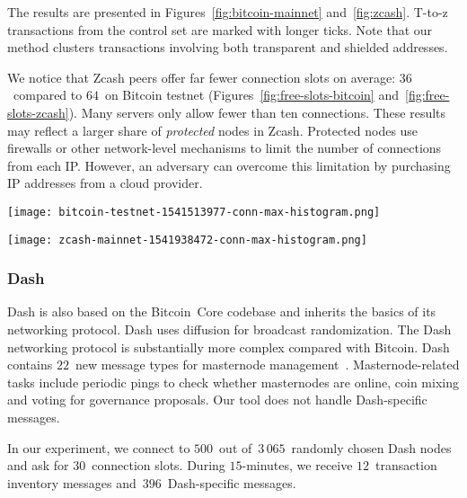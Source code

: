 The results are presented in Figures~\ref{fig:bitcoin-mainnet} and~\ref{fig:zcash}.
T-to-z transactions from the control set are marked with longer ticks.
Note that our method clusters transactions involving both transparent and shielded addresses.

We notice that Zcash peers offer far fewer connection slots on average: $36$~compared to $64$~on Bitcoin testnet (Figures~\ref{fig:free-slots-bitcoin} and~\ref{fig:free-slots-zcash}).
Many servers only allow fewer than ten connections.
These results may reflect a larger share of \textit{protected} nodes in Zcash.
Protected nodes use firewalls or other network-level mechanisms to limit the number of connections from each IP\@.
However, an adversary can overcome this limitation by purchasing IP addresses from a cloud provider.

\begin{figure*}
	\centering
	\begin{minipage}{0.5\textwidth}
		\centering
		\texttt{[image: bitcoin-testnet-1541513977-conn-max-histogram.png]}
		\caption{Free connection slots for Bitcoin testnet.}
		\label{fig:free-slots-bitcoin}
	\end{minipage}\hfill
	\begin{minipage}{0.5\textwidth}
		\centering
		\texttt{[image: zcash-mainnet-1541938472-conn-max-histogram.png]}
		\caption{Free connection slots for Zcash mainnet.}
		\label{fig:free-slots-zcash}
	\end{minipage}\hfill
\end{figure*}


\subsubsection{Dash}

Dash is also based on the Bitcoin~Core codebase and inherits the basics of its networking protocol.
Dash uses diffusion for broadcast randomization.
The Dash networking protocol is substantially more complex compared with Bitcoin.
Dash contains $22$~new message types for masternode management~\cite{Schinzel2015}.
Masternode-related tasks include periodic pings to check whether masternodes are online, coin mixing and voting for governance proposals.
Our tool does not handle Dash-specific messages.

In our experiment, we connect to $500$~out of~$3\,065$~randomly chosen Dash nodes and ask for $30$~connection slots.
During $15$-minutes, we receive $12$~transaction inventory messages and~$396$~Dash-specific messages.

